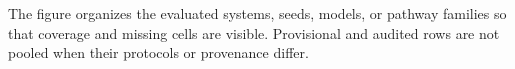 The figure organizes the evaluated systems, seeds, models, or pathway families so that coverage and missing cells are visible. Provisional and audited rows are not pooled when their protocols or provenance differ.
